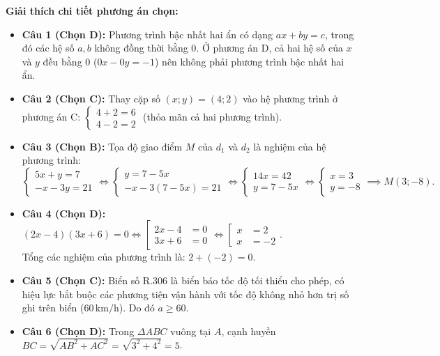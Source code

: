 \documentclass[12pt,a4paper]{article}
\begin{document}
\noindent\textbf{Giải thích chi tiết phương án chọn:}
\begin{itemize}[leftmargin=18pt, itemsep=3.5pt, parsep=0pt]
  \item \textbf{Câu 1 (Chọn D):} Phương trình bậc nhất hai ẩn có dạng $ax + by = c$, trong đó các hệ số $a, b$ không đồng thời bằng 0. Ở phương án D, cả hai hệ số của $x$ và $y$ đều bằng 0 ($0x - 0y = -1$) nên không phải phương trình bậc nhất hai ẩn.
  \item \textbf{Câu 2 (Chọn C):} Thay cặp số $(x; y) = (4; 2)$ vào hệ phương trình ở phương án C:
  $\begin{cases} 4 + 2 = 6 \\ 4 - 2 = 2 \end{cases}$ (thỏa mãn cả hai phương trình).
  \item \textbf{Câu 3 (Chọn B):} Tọa độ giao điểm $M$ của $d_1$ và $d_2$ là nghiệm của hệ phương trình:
  \[
    \begin{cases}
      5x + y = 7 \\
      -x - 3y = 21
    \end{cases}
    \iff
    \begin{cases}
      y = 7 - 5x \\
      -x - 3(7 - 5x) = 21
    \end{cases}
    \iff
    \begin{cases}
      14x = 42 \\
      y = 7 - 5x
    \end{cases}
    \iff
    \begin{cases}
      x = 3 \\
      y = -8
    \end{cases}
    \implies M(3; -8).
  \]
  \item \textbf{Câu 4 (Chọn D):} $(2x - 4)(3x + 6) = 0 \iff \left[\begin{aligned} 2x - 4 &= 0 \\ 3x + 6 &= 0 \end{aligned}\right. \iff \left[\begin{aligned} x &= 2 \\ x &= -2 \end{aligned}\right.$.\\
  Tổng các nghiệm của phương trình là: $2 + (-2) = 0$.
  \item \textbf{Câu 5 (Chọn C):} Biển số R.306 là biển báo tốc độ tối thiểu cho phép, có hiệu lực bắt buộc các phương tiện vận hành với tốc độ không nhỏ hơn trị số ghi trên biển ($60\,\text{km/h}$). Do đó $a \ge 60$.
  \item \textbf{Câu 6 (Chọn D):} Trong $\Delta ABC$ vuông tại $A$, cạnh huyền $BC = \sqrt{AB^2 + AC^2} = \sqrt{3^2 + 4^2} = 5$.\\

\end{itemize}
\end{document}
